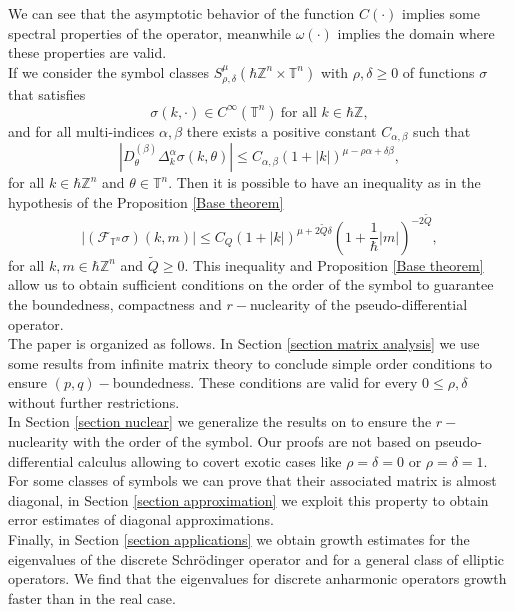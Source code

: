 \documentclass[pdflatex,sn-mathphys-num]{sn-jnl}%
\theoremstyle{thmstyleone}%
\theoremstyle{thmstyletwo}%
\theoremstyle{thmstylethree}%
\begin{document}
\indent We can see that the asymptotic behavior of the function $C(\cdot)$ implies some spectral properties of the operator, meanwhile $\omega(\cdot)$ implies the domain where these properties are valid. \\
If we consider the symbol classes $S^\mu_{\rho,\delta}(\hbar\mathbb{Z}^n\times\mathbb{T}^n)$ with $\rho,\delta\geq 0$ of functions $\sigma$ that satisfies
\[\sigma(k,\cdot)\in C^\infty(\mathbb{T}^n) \ \text{for all } k\in\hbar\mathbb{Z},\]
and for all multi-indices $\alpha,\beta$ there exists a positive constant $C_{\alpha,\beta}$ such that
\begin{equation}\label{Symbol class def}
|D_\theta^{(\beta)}\Delta_k^\alpha \sigma(k,\theta)|\leq C_{\alpha,\beta} (1+|k|)^{\mu -\rho\alpha+\delta\beta }, 
\end{equation}
for all $k\in\hbar\mathbb{Z}^n$ and $\theta\in\mathbb{T}^n$. Then it is possible to have an inequality as in the hypothesis of the Proposition \ref{Base theorem} 
\[|(\mathcal{F}_{\mathbb{T}^n}\sigma)(k,m)|\leq C_Q (1+|k|)^{\mu+2\tilde{Q}\delta} \left(1+\frac{1}{\hbar}|m|\right)^{-2\tilde{Q}}, \]
for all $k,m\in\hbar\mathbb{Z}^n$ and $\tilde{Q}\geq 0$. This inequality and Proposition \ref{Base theorem} allow us to obtain sufficient conditions on the order of the symbol to guarantee the boundedness, compactness and $r-$nuclearity of the pseudo-differential operator.\\
\indent The paper is organized as follows. In Section \ref{section matrix analysis} we use some results from infinite matrix theory to conclude simple order conditions to ensure $(p,q)-$boundedness. These conditions are valid for every $0\leq \rho,\delta $ without further restrictions.\\
\indent In Section \ref{section nuclear} we generalize the results on \cite{delgado2015r} to ensure the $r-$nuclearity with the order of the symbol. Our proofs are not based on pseudo-differential calculus allowing to covert exotic cases like $\rho=\delta=0$ or $\rho=\delta=1$.\\
\indent For some classes of symbols we can prove that their associated matrix is almost diagonal, in Section \ref{section approximation} we exploit this property to obtain error estimates of diagonal approximations.\\
\indent Finally, in Section \ref{section applications} we obtain growth estimates for the eigenvalues of the discrete Schrödinger operator and for a general class of elliptic operators. We find that the eigenvalues for discrete anharmonic operators growth faster than in the real case.
\end{document}
